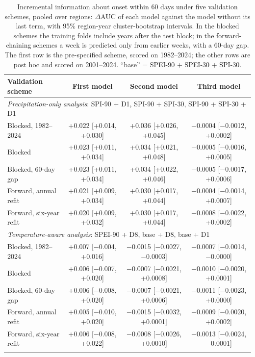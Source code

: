 \begin{table}[tbp]
\caption{Incremental information about onset within 60 days under five validation schemes, pooled over
regions: $\Delta$AUC of each model against the model without its last term, with 95\% region-year
cluster-bootstrap intervals. In the blocked schemes the training folds include years after the test block;
in the forward-chaining schemes a week is predicted only from earlier weeks, with a 60-day gap. The first
row is the pre-specified scheme, scored on 1982--2024; the other rows are post hoc and scored on
2001--2024. ``base'' = SPEI-90 + SPEI-30 + SPI-30.}
\label{tab:forward}
\footnotesize\setlength{\tabcolsep}{2pt}
\begin{tabular*}{\textwidth}{@{\extracolsep\fill}lccc}
\toprule
Validation scheme & First model & Second model & Third model\\
\midrule
\multicolumn{4}{l}{\textit{Precipitation-only analysis}: SPI-90 + D1, SPI-90 + SPI-30, SPI-90 + SPI-30 + D1}\\
Blocked, 1982--2024 & +0.022 [+0.014, +0.030] & +0.036 [+0.026, +0.045] & $-$0.0004 [$-$0.0012, +0.0002] \\
Blocked & +0.023 [+0.011, +0.034] & +0.034 [+0.021, +0.048] & $-$0.0005 [$-$0.0016, +0.0005] \\
Blocked, 60-day gap & +0.023 [+0.011, +0.034] & +0.034 [+0.022, +0.046] & $-$0.0005 [$-$0.0017, +0.0006] \\
Forward, annual refit & +0.021 [+0.009, +0.034] & +0.030 [+0.017, +0.044] & $-$0.0004 [$-$0.0014, +0.0007] \\
Forward, six-year refit & +0.020 [+0.009, +0.032] & +0.030 [+0.017, +0.044] & $-$0.0008 [$-$0.0022, +0.0002] \\
\midrule
\multicolumn{4}{l}{\textit{Temperature-aware analysis}: SPEI-90 + D8, base + D8, base + D1}\\
Blocked, 1982--2024 & +0.007 [$-$0.004, +0.016] & $-$0.0015 [$-$0.0027, $-$0.0003] & $-$0.0007 [$-$0.0014, $-$0.0000] \\
Blocked & +0.006 [$-$0.007, +0.020] & $-$0.0007 [$-$0.0021, +0.0008] & $-$0.0010 [$-$0.0020, +0.0001] \\
Blocked, 60-day gap & +0.006 [$-$0.008, +0.020] & $-$0.0007 [$-$0.0021, +0.0006] & $-$0.0011 [$-$0.0023, +0.0000] \\
Forward, annual refit & +0.005 [$-$0.010, +0.020] & $-$0.0015 [$-$0.0032, +0.0001] & $-$0.0009 [$-$0.0020, +0.0002] \\
Forward, six-year refit & +0.006 [$-$0.008, +0.022] & $-$0.0008 [$-$0.0026, +0.0010] & $-$0.0013 [$-$0.0024, $-$0.0001] \\
\botrule
\end{tabular*}
\end{table}
